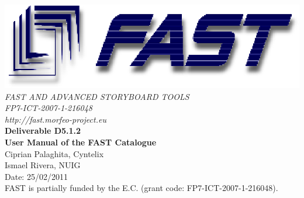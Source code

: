 \documentclass{fast_latex}
\newcommand\deliverableNumber{D5.1.2}
\newcommand\deliverableTitle{User Manual of the FAST Catalogue}
\newcommand\deliverableTitleShort{Catalogue User Manual}
\newcommand\authorOne{Ciprian Palaghita, Cyntelix}
\newcommand\authorTwo{Ismael Rivera, NUIG}
\begin{document}
	\begin{center}
		\includegraphics{images/FAST_logo}\\
		\vspace{1cm}
		{\LARGE{\sffamily \emph{FAST AND ADVANCED STORYBOARD TOOLS}}}\\
		\vspace{0.5cm}
		{\LARGE \sffamily \emph{FP7-ICT-2007-1-216048}}\\
		\vspace{0.5cm}
		{\LARGE \sffamily \emph{http://fast.morfeo-project.eu}}\\
		\vspace{4cm}
		{\LARGE \sffamily \textbf{Deliverable \deliverableNumber}}\\
		\vspace{0.5cm}
		{\LARGE \sffamily \textbf{\deliverableTitle}}\\
		\vspace{2cm}
		{\large \sffamily \authorOne}\\
		\vspace{0.2cm}
		{\large \sffamily \authorTwo}\\
		\vspace{0.5cm}
		\vfill
		{\large \sffamily Date: 25/02/2011}\\
		\vspace{1cm}
		{\sffamily FAST is partially funded by the E.C. (grant code: FP7-ICT-2007-1-216048).}
		
	\end{center}


\clearpage
\pagestyle{scrheadings}

\rohead{\small{\today}}
\end{document}
